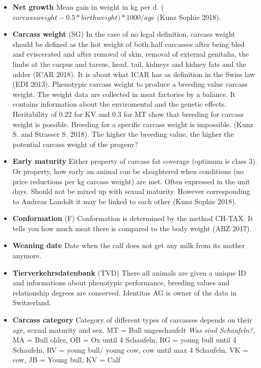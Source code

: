 \documentclass[]{article}
\begin{document}
\begin{itemize}
\item
  \textbf{Net growth} Mean gain in weight in kg per d. (
  \(carcass weight - 0.5 * birth weight) * 1000 / age\) (Kunz Sophie
  2018).
\item
  \textbf{Carcass weight} (SG) In the case of no legal definition,
  carcass weight should be defined as the hot weight of both half
  carcasses after being bled and eviscerated and after removal of skin,
  removal of external genitalia, the limbs at the carpus and tarsus,
  head, tail, kidneys and kidney fats and the udder (ICAR 2018). It is
  about what ICAR has as definition in the Swiss law (EDI 2013).
  Phenotypic carcass weight to produce a breeding value carcass weight.
  The weight data are collected in meat factories by a balance. It
  contains information about the enviromental and the genetic effects.
  Heritability of 0.22 for KV and 0.3 for MT show that breeding for
  carcass weight is possible. Breeding for a specific carcass weight is
  impossible. (Kunz S. and Strasser S. 2018). The higher the breeding
  value, the higher the potential carcass weight of the progeny?
\item
  \textbf{Early maturity} Either property of carcass fat coverage
  (optimum is class 3). Or property, how early an animal can be
  slaughtered when conditions (no price reductions per kg carcass
  weight) are met. Often expressed in the unit days. Should not be mixed
  up with sexual maturity. However corresponding to Andreas Landolt it
  may be linked to each other (Kunz Sophie 2018).
\item
  \textbf{Conformation} (F) Conformation is determined by the method
  CH-TAX. It tells you how much meat there is compared to the body
  weight (ABZ 2017).
\item
  \textbf{Weaning date} Date when the calf does not get any milk from
  its mother anymore.
\item
  \textbf{Tierverkehrsdatenbank} (TVD) There all animals are given a
  unique ID and informations about phenotypic performance, breeding
  values and relationship degrees are conserved. Identitas AG is owner
  of the data in Switzerland.
\item
  \textbf{Carcass category} Category of different types of carcasses
  depends on their age, sexual maturity and sex. MT = Bull ungeschaufelt
  \emph{Was sind Schaufeln?}, MA = Bull older, OB = Ox until 4
  Schaufeln, RG = young bull until 4 Schaufeln, RV = young bull/ young
  cow, cow until max 4 Schaufeln, VK = cow, JB = Young bull, KV = Calf

\end{itemize}
\end{document}

